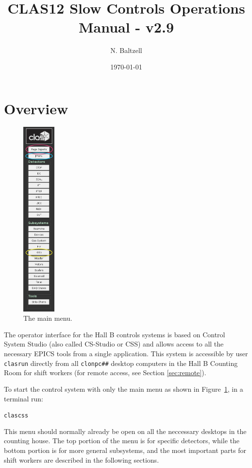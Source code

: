 \documentclass[amsmath,amssymb,notitlepage,11pt]{revtex4}
\begin{document}
\title{CLAS12 Slow Controls Operations Manual - v2.9}
\author{N. Baltzell}
\date{\today}
\begin{abstract}
\end{abstract}

\maketitle
\tableofcontents
\newpage

\section{Overview}

\begin{figure}\centering\vspace{1cm}
  \includegraphics[width=0.15\textwidth]{pics/mainmenu}
  \caption{The main menu.\label{fig:mainmenu}}
\end{figure}

The operator interface for the Hall B controls systems is based on Control System Studio (also called CS-Studio or CSS) and allows access to all the necessary EPICS tools from a single application.  This system is accessible by user \texttt{clasrun} directly from all \texttt{clonpc\#\#} desktop computers in the Hall B Counting Room for shift workers (for remote access, see Section \ref{sec:remote}).


To start the control system with only the main menu as shown in Figure~\ref{fig:mainmenu}, in a terminal run: \begin{center}\texttt{clascss}\end{center}  This menu should normally already be open on all the neccessary desktops in the counting house.  The top portion of the menu is for specific detectors, while the bottom portion is for more general subsystems, and the most important parts for shift workers are described in the following sections.
\end{document}
